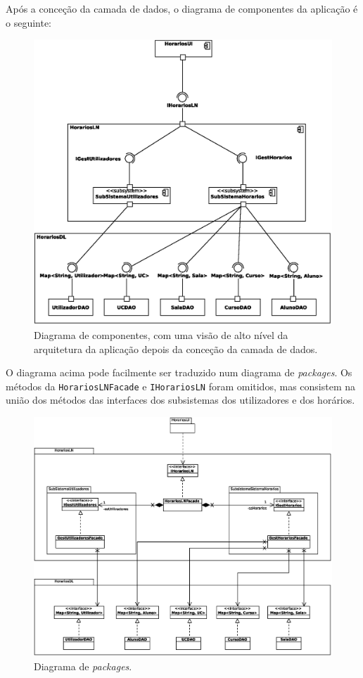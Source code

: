 \documentclass[12pt, a4paper]{article}
\begin{document}
Após a conceção da camada de dados, o diagrama de componentes da aplicação é o seguinte:

\begin{figure}[H]
    \centering
    \includegraphics[scale=0.5]{Imagens/Modelos/ComponentesDAO.svg.eps}
    \caption{
        Diagrama de componentes, com uma visão de alto nível da arquitetura da aplicação depois da
        conceção da camada de dados.
    }
\end{figure}

O diagrama acima pode facilmente ser traduzido num diagrama de \emph{packages}. Os métodos da
\texttt{HorariosLNFacade} e \texttt{IHorariosLN} foram omitidos, mas consistem na união dos
métodos das interfaces dos subsistemas dos utilizadores e dos horários.

\begin{figure}[H]
    \centering
    \includegraphics[scale=0.5]{Imagens/Modelos/GeralDAO.svg.eps}
    \caption{
        Diagrama de \emph{packages}.
    }
\end{figure}
\end{document}
